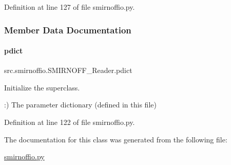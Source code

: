 Definition at line 127 of file smirnoffio.\+py.



\subsubsection{Member Data Documentation}
\mbox{\label{classsrc_1_1smirnoffio_1_1SMIRNOFF__Reader_a215b10b0652a0bf3dc1b142f7893a9ec}} 
\paragraph{\texorpdfstring{pdict}{pdict}}
{\footnotesize\ttfamily src.\+smirnoffio.\+S\+M\+I\+R\+N\+O\+F\+F\+\_\+\+Reader.\+pdict}



Initialize the superclass. 

\+:) The parameter dictionary (defined in this file) 

Definition at line 122 of file smirnoffio.\+py.



The documentation for this class was generated from the following file\+:\begin{DoxyCompactItemize}
\item 
\hyperlink{smirnoffio_8py}{smirnoffio.\+py}\end{DoxyCompactItemize}
